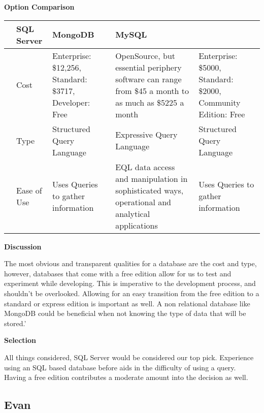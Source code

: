 \documentclass[letterpaper, 10pt, draftclsnofoot, compsoc, onecolumn]{IEEEtran}
\begin{document}
{\newpage
{\noindent\rmfamily\bfseries\color{black} Option Comparison \par}
\tablehead{}
\begin{supertabular}{|p{2cm}|p{2.5cm}|p{2.5cm}|p{2.5cm}|p{2.5cm}|}
\hline & SQL Server & MongoDB & MySQL\\ \hline
& Cost & Enterprise: \$12,256, Standard: \$3717, Developer: Free & OpenSource, but essential periphery software can range from \$45 a month to as much as \$5225 a month & Enterprise: \$5000, Standard: \$2000, Community Edition: Free \\ \hline
& Type & Structured Query Language & Expressive Query Language & Structured Query Language\\ \hline
& Ease of Use & Uses Queries to gather information & EQL data access and manipulation in sophisticated ways, operational and analytical applications \cite{ibmbpnetwork} & Uses Queries to gather information \\ \hline
\end{supertabular}

\newpage
{\noindent\rmfamily\bfseries\color{black} Discussion \par}
{\noindent The most obvious and transparent qualities for a database are the cost and type, however, databases that come with a free edition allow for us to test and experiment while developing. This is imperative to the development process, and shouldn't be overlooked. Allowing for an easy transition from the free edition to a standard or express edition is important as well. A non relational database like MongoDB could be beneficial when not knowing the type of data that will be stored.' \par}

\medskip
{\noindent\rmfamily\bfseries\color{black} Selection \par}
{\noindent All things considered, SQL Server would be considered our top pick. Experience using an SQL based database before aids in the difficulty of using a query. Having a free edition contributes a moderate amount into the decision as well.\par}

\medskip








\newpage
\subsection{Evan}
\vspace{1pc}
}
\end{document}
